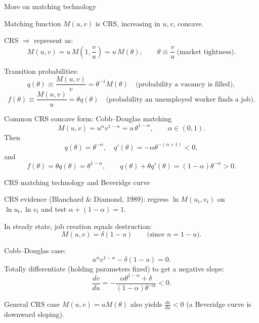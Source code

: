 \documentclass[aspectratio=169,xcolor=dvipsnames]{beamer}
\let\tempone\itemize
\let\temptwo\enditemize
\renewenvironment{itemize}{\tempone\addtolength{\itemsep}{\fill}}{\temptwo}
\begin{document}
\begin{frame}{More on matching technology}
\label{slide:MP_27_Matching}
\small
\begin{itemize}
    \item Matching function \(M(u,v)\) is CRS, increasing in \(u,v\), concave.
    \item CRS \(\Rightarrow\) represent as:
    \[
        M(u,v)=u\,M\!\left(1,\frac{v}{u}\right)=u\,M(\theta),
        \qquad \theta\equiv \frac{v}{u}\ \text{(market tightness)}.
    \]
    \item Transition probabilities:
    \[
        q(\theta)\equiv \frac{M(u,v)}{v}=\theta^{-1}M(\theta)
        \quad \text{(probability a vacancy is filled)},
    \]
    \[
        f(\theta)\equiv \frac{M(u,v)}{u}=\theta q(\theta)
        \quad \text{(probability an unemployed worker finds a job)}.
    \]
    \item Common CRS concave form: Cobb--Douglas matching
    \[
        M(u,v)=u^{\alpha}v^{1-\alpha}=u\,\theta^{1-\alpha},\qquad \alpha\in(0,1).
    \]
    Then
    \[
        q(\theta)=\theta^{-\alpha},\quad q'(\theta)=-\alpha\theta^{-(\alpha+1)}<0,
    \]
    and
    \[
        f(\theta)=\theta q(\theta)=\theta^{1-\alpha},\qquad
        q(\theta)+\theta q'(\theta)=(1-\alpha)\theta^{-\alpha}>0.
    \]
\end{itemize}
\end{frame}

\begin{frame}{CRS matching technology and Beveridge curve}
\label{slide:MP_28_BeveridgeDerive}
\small
\begin{itemize}
    \item CRS evidence (Blanchard \& Diamond, 1989): regress \(\ln M(u_t,v_t)\) on \(\ln u_t,\ln v_t\) and test \(\alpha+(1-\alpha)=1\).
    \item In steady state, job creation equals destruction:
    \[
        M(u,v)=\delta(1-u)\qquad \big(\text{since }n=1-u\big).
    \]
    \item Cobb--Douglas case:
    \[
        u^\alpha v^{1-\alpha}-\delta(1-u)=0.
    \]
    Totally differentiate (holding parameters fixed) to get a negative slope:
    \[
        \frac{dv}{du}=-\frac{\alpha \theta^{1-\alpha}+\delta}{(1-\alpha)\theta^{-\alpha}}<0.
    \]
    \item General CRS case \(M(u,v)=uM(\theta)\) also yields \(\frac{dv}{du}<0\)
    (a Beveridge curve is downward sloping).
\end{itemize}
\end{frame}
\end{document}
